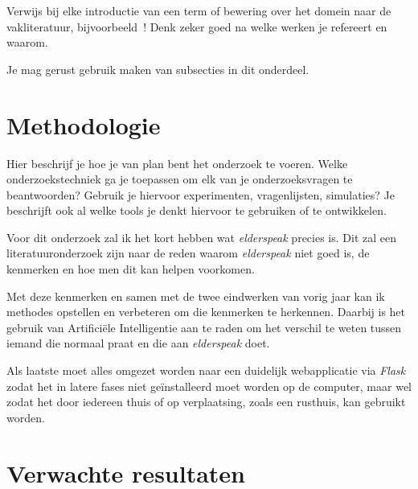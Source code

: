 Verwijs bij elke introductie van een term of bewering over het domein naar de vakliteratuur, bijvoorbeeld~\autocite{Doll1954}! Denk zeker goed na welke werken je refereert en waarom.


Je mag gerust gebruik maken van subsecties in dit onderdeel.

\section{Methodologie}
\label{sec:methodologie}

Hier beschrijf je hoe je van plan bent het onderzoek te voeren. Welke onderzoekstechniek ga je toepassen om elk van je onderzoeksvragen te beantwoorden? Gebruik je hiervoor experimenten, vragenlijsten, simulaties? Je beschrijft ook al welke tools je denkt hiervoor te gebruiken of te ontwikkelen.

Voor dit onderzoek zal ik het kort hebben wat \textit{elderspeak} precies is. Dit zal een literatuuronderzoek zijn naar de reden waarom \textit{elderspeak} niet goed is, de kenmerken en hoe men dit kan helpen voorkomen.

Met deze kenmerken en samen met de twee eindwerken van vorig jaar kan ik methodes opstellen en verbeteren om die kenmerken te herkennen. Daarbij is het gebruik van Artificiële Intelligentie aan te raden om het verschil te weten tussen iemand die normaal praat en die aan \textit{elderspeak} doet.

Als laatste moet alles omgezet worden naar een duidelijk webapplicatie via \textit{Flask} zodat het in latere fases niet geïnstalleerd moet worden op de computer, maar wel zodat het door iedereen thuis of op verplaatsing, zoals een rusthuis, kan gebruikt worden.


\section{Verwachte resultaten}
\label{sec:verwachte_resultaten}

